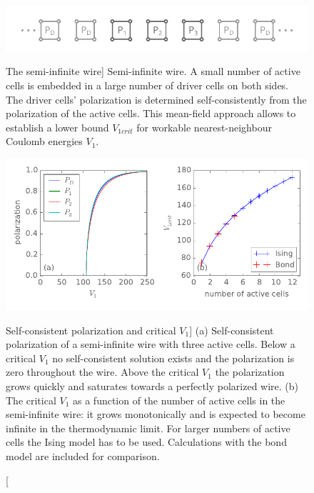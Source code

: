 \begin{figure}
  \center
  \includegraphics{semi_infinite_wire}
  \caption
  [The semi-infinite wire]
  {
  Semi-infinite wire. A small number of active cells is embedded in a large
  number of driver cells on both sides. The driver cells' polarization is
  determined self-consistently from the polarization of the active cells. This
  mean-field approach allows to establish a lower bound $V_{1crit}$ for workable
  nearest-neighbour Coulomb energies $V_1$.
  }
  \label{fig:semi_infinite_wire}
  
  \vspace*{0.75cm}
  
  \includegraphics{critical_V1}
  \caption
  [Self-consistent polarization and critical $V_1$]
  {
  (a) Self-consistent polarization of a semi-infinite wire with three active cells.
  Below a critical $V_1$ no self-consistent solution exists and the polarization
  is zero throughout the wire. Above the critical $V_1$ the polarization grows
  quickly and saturates towards a perfectly polarized wire.
  (b) The critical $V_1$ as a function of the number of active cells in the
  semi-infinite wire: it grows monotonically and is expected to become infinite
  in the thermodynamic limit. For larger numbers of active cells the Ising model
  has to be used. Calculations with the bond model are included for comparison.
  }
  \label{fig:critical_V1}
\end{figure}

